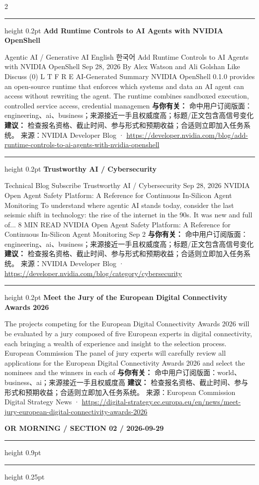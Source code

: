 \documentclass[10.5pt]{ctexart}
\begin{document}
\begin{multicols}{2}
\vspace{2mm}
\hrule height 0.2pt
\vspace{2mm}
{\large\bfseries Add Runtime Controls to AI Agents with NVIDIA OpenShell}\par
Agentic AI / Generative AI English 한국어 Add Runtime Controls to AI Agents with NVIDIA OpenShell Sep 28, 2026 By Alex Watson and Ali Golshan Like Discuss (0) L T F R E AI-Generated Summary NVIDIA OpenShell 0.1.0 provides an open-source runtime that enforces which systems and data an AI agent can access without rewriting the agent. The runtime combines sandboxed execution, controlled service access, credential managemen
\textbf{与你有关：} 命中用户订阅版面：engineering、ai、business；来源接近一手且权威度高；标题/正文包含高信号变化
\textbf{建议：} 检查报名资格、截止时间、参与形式和预期收益；合适则立即加入任务系统。
{\footnotesize\color{ormuted} 来源：NVIDIA Developer Blog · \url{https://developer.nvidia.com/blog/add-runtime-controls-to-ai-agents-with-nvidia-openshell}}
\vspace{2mm}
\hrule height 0.2pt
\vspace{2mm}
{\large\bfseries Trustworthy AI / Cybersecurity}\par
Technical Blog Subscribe Trustworthy AI / Cybersecurity Sep 28, 2026 NVIDIA Open Agent Safety Platform: A Reference for Continuous In-Silicon Agent Monitoring To understand where agentic AI stands today, consider the last seismic shift in technology: the rise of the internet in the 90s. It was new and full of... 8 MIN READ NVIDIA Open Agent Safety Platform: A Reference for Continuous In-Silicon Agent Monitoring Sep 2
\textbf{与你有关：} 命中用户订阅版面：engineering、ai、business；来源接近一手且权威度高；标题/正文包含高信号变化
\textbf{建议：} 检查报名资格、截止时间、参与形式和预期收益；合适则立即加入任务系统。
{\footnotesize\color{ormuted} 来源：NVIDIA Developer Blog · \url{https://developer.nvidia.com/blog/category/cybersecurity}}
\vspace{2mm}
\hrule height 0.2pt
\vspace{2mm}
{\large\bfseries Meet the Jury of the European Digital Connectivity Awards 2026}\par
The projects competing for the European Digital Connectivity Awards 2026 will be evaluated by a jury composed of five European experts in digital connectivity, each bringing a wealth of experience and insight to the selection process. European Commission The panel of jury experts will carefully review all applications for the European Digital Connectivity Awards 2026 and select the nominees and the winners in each of
\textbf{与你有关：} 命中用户订阅版面：world、business、ai；来源接近一手且权威度高
\textbf{建议：} 检查报名资格、截止时间、参与形式和预期收益；合适则立即加入任务系统。
{\footnotesize\color{ormuted} 来源：European Commission Digital Strategy News · \url{https://digital-strategy.ec.europa.eu/en/news/meet-jury-european-digital-connectivity-awards-2026}}
\end{multicols}
\newpage
{\small\bfseries OR MORNING / SECTION 02 / 2026-09-29}
\vspace{2mm}
\hrule height 0.9pt
\vspace{1.5mm}
\hrule height 0.25pt
\vspace{4mm}
\end{document}
